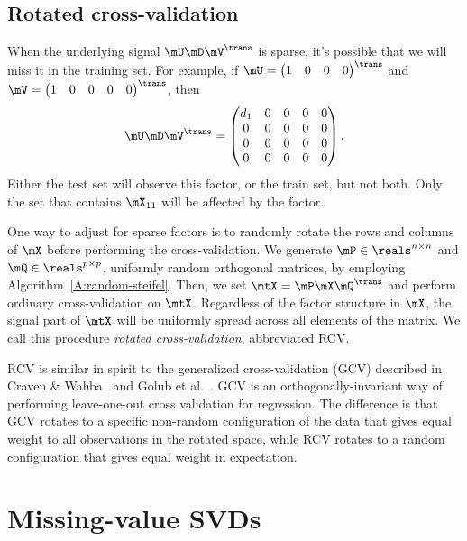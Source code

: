 \subsection{Rotated cross-validation}

When the underlying signal $\mU \mD \mV^\trans$ is sparse, it's possible that we will miss it in the training set.  For example, if 
\(
    \mU 
    =
    \left(
    \begin{matrix}
        1 & 0 & 0 & 0
    \end{matrix}
    \right)^\trans
\)
and
\(
    \mV
    =
    \left(
    \begin{matrix}
        1 & 0 & 0 & 0 & 0
    \end{matrix}
    \right)^\trans
\),
then
\[
    \mU \mD \mV^\trans
    =
    \left(
    \begin{matrix}
        d_{1} & 0 & 0 & 0 & 0 \\
        0     & 0 & 0 & 0 & 0 \\
        0     & 0 & 0 & 0 & 0 \\
        0     & 0 & 0 & 0 & 0 
    \end{matrix}
    \right).
\]
Either the test set will observe this factor, or the train set, but not both.  Only the set that contains $\mX_{11}$ will be affected by the factor.

One way to adjust for sparse factors is to randomly rotate the rows and
columns of $\mX$ before performing the cross-validation. We generate $\mP \in
\reals^{n \times n}$ and $\mQ \in \reals^{p \times p}$, uniformly random
orthogonal matrices, by employing Algorithm~\ref{A:random-steifel}. Then, we
set $\mtX = \mP \mX \mQ^\trans$ and perform ordinary cross-validation on
$\mtX$. Regardless of the factor structure in $\mX$, the signal part of $\mtX$
will be uniformly spread across all elements of the matrix. We call this
procedure \emph{rotated cross-validation}, abbreviated RCV.  

RCV is similar in spirit to the generalized cross-validation (GCV) described
in Craven \& Wahba~\cite{craven1978smoothing} and Golub et
al.~\cite{golub1979generalized}. GCV is an orthogonally-invariant way of
performing leave-one-out cross validation for regression. The difference is
that GCV rotates to a specific non-random configuration of the data that gives
equal weight to all observations in the rotated space, while RCV rotates to a 
random configuration that gives equal weight in expectation.


\section{Missing-value SVDs}\label{S:missing-values-svds}

